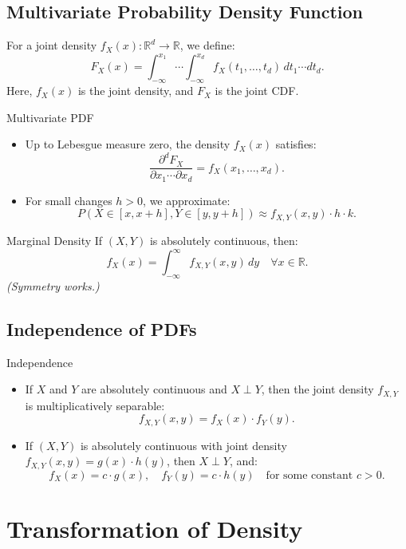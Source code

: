 \subsection{Multivariate Probability Density Function}
For a joint density \( f_X(x) : \mathbb{R}^d \to \mathbb{R} \), we define:
\[
F_X(x) = \int_{-\infty}^{x_1} \cdots \int_{-\infty}^{x_d} f_X(t_1, \ldots, t_d) \, dt_1 \cdots dt_d.
\]
Here, \( f_X(x) \) is the joint density, and \( F_X \) is the joint CDF.


\begin{rmk}{Multivariate PDF}
\begin{itemize}
    \item Up to Lebesgue measure zero, the density \( f_X(x) \) satisfies:
    \[
    \frac{\partial^d F_X}{\partial x_1 \cdots \partial x_d} = f_X(x_1, \ldots, x_d).
    \]
    \item For small changes \( h > 0 \), we approximate:
    \[
    P(X \in [x, x+h], Y \in [y, y+h]) \approx f_{X,Y}(x, y) \cdot h \cdot k.
    \]
\end{itemize}	
\end{rmk}

\begin{thm}{Marginal Density}
If \( (X, Y) \) is absolutely continuous, then:
\[
f_X(x) = \int_{-\infty}^\infty f_{X,Y}(x, y) \, dy \quad \forall x \in \mathbb{R}.
\]
\textit{(Symmetry works.)}
\end{thm}

\subsection{Independence of PDFs}
\begin{thm}{Independence}
\begin{itemize}
    \item If \( X \) and \( Y \) are absolutely continuous and \( X \perp Y \), then the joint density \( f_{X,Y} \) is multiplicatively separable:
    \[
    f_{X,Y}(x, y) = f_X(x) \cdot f_Y(y).
    \]
    \item If \( (X, Y) \) is absolutely continuous with joint density \( f_{X,Y}(x, y) = g(x) \cdot h(y) \), then \( X \perp Y \), and:
    \[
    f_X(x) = c \cdot g(x), \quad f_Y(y) = c \cdot h(y) \quad \text{for some constant } c > 0.
    \]
\end{itemize}
\end{thm}


\newpage
\section{Transformation of Density}

